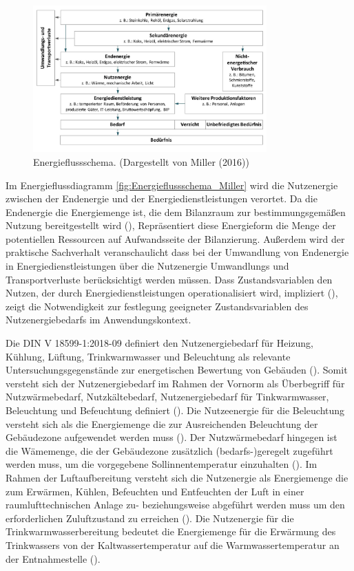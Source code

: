 \begin{figure}[H]
    \centering
    \includegraphics[width=0.8\textwidth]{../../Ressourcen/Bilder/Energiefluss_Miller.jpg}
    \caption{Energieflussschema. (Dargestellt von Miller (2016))}
    \label{fig:Energieflussschema_Miller}
\end{figure}

Im Energieflussdiagramm \eqref{fig:Energieflussschema_Miller} wird die Nutzenergie zwischen der Endenergie und der Energiedienstleistungen verortet. 
Da die Endenergie die Energiemenge ist, die dem Bilanzraum zur bestimmungsgemäßen Nutzung bereitgestellt wird (\cite[Kapitel 3.1.2]{DIN18599.2018}), 
Repräsentiert diese Energieform die Menge der potentiellen Ressourcen auf Aufwandsseite der Bilanzierung.
Außerdem wird der praktische Sachverhalt veranschaulicht dass bei der Umwandlung von Endenergie in Energiedienstleistungen über die Nutzenergie 
Umwandlungs und Transportverluste berücksichtigt werden müssen.
Dass Zustandsvariablen den Nutzen, der durch Energiedienstleistungen operationalisiert wird, impliziert (\cite[S. 110]{Miller.2016}), zeigt die Notwendigkeit zur 
festlegung geeigneter Zustandsvariablen des Nutzenergiebedarfs im Anwendungskontext.

Die DIN V 18599-1:2018-09 definiert den Nutzenergiebedarf für Heizung, Kühlung, Lüftung, Trinkwarmwasser und Beleuchtung als relevante Untersuchungsgegenstände 
zur energetischen Bewertung von Gebäuden (\cite{DIN18599.2018}). 
Somit versteht sich der Nutzenergiebedarf im Rahmen der Vornorm als Überbegriff für Nutzwärmebedarf, Nutzkältebedarf, Nutzenergiebedarf für Tinkwarmwasser, Beleuchtung und 
Befeuchtung definiert (\cite[Kapitel 3.1.3]{DIN18599.2018}).
Die Nutzeenergie für die Beleuchtung versteht sich als die Energiemenge die zur Ausreichenden Beleuchtung der Gebäudezone aufgewendet werden muss (\cite[Kapitel 5.3.1]{DIN18599.2018}).
Der Nutzwärmebedarf hingegen ist die Wämemenge, die der Gebäudezone zusätzlich (bedarfs-)geregelt zugeführt werden muss, um die vorgegebene 
Sollinnentemperatur einzuhalten (\cite[Kapitel 5.3.1]{DIN18599.2018}).
Im Rahmen der Luftaufbereitung versteht sich die Nutzenergie als Energiemenge die zum Erwärmen, Kühlen, Befeuchten und Entfeuchten der Luft in einer 
raumlufttechnischen Anlage zu- beziehungsweise abgeführt werden muss um den erforderlichen Zuluftzustand zu erreichen (\cite[Kapitel 5.3.1]{DIN18599.2018}).
Die Nutzenergie für die Trinkwarmwasserbereitung bedeutet die Energiemenge für die Erwärmung des Trinkwassers von der Kaltwassertemperatur auf die 
Warmwassertemperatur an der Entnahmestelle (\cite[Kapitel 5.3.1]{DIN18599.2018}).

